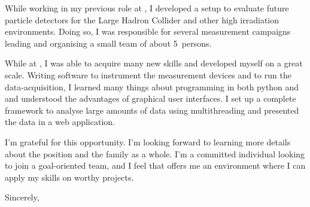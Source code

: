 \documentclass[12pt]{extarticle}
\begin{document}
%
While working in my previous role at \@oldcomp, I developed a setup to evaluate future particle detectors for the Large Hadron Collider and other high irradiation environments.
Doing so, I was responsible for several measurement campaigns leading and organising a small team of about \SI{5}{persons}.\par
%
While at \@oldcomp, I was able to acquire many new skills and developed myself on a great scale.
Writing software to instrument the measurement devices and to run the data-acquisition, I learned many things about programming in both python and \cpp and understood the advantages of graphical user interfaces.
I set up a complete framework to analyse large amounts of data using multithreading and presented the data in a web application.\par
%
I'm grateful for this opportunity.
I'm looking forward to learning more details about the \@position position and the \@company family as a whole.
I'm a committed individual looking to join a goal-oriented team, and I feel that \@company offers me an environment where I can apply my skills on worthy projects.\par
%
Sincerely,\par
%
\@author
%
\end{document}
